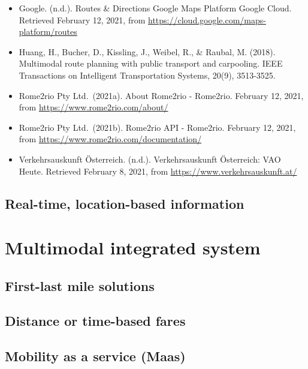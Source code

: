 \documentclass[
]{book}
\begin{document}
\begin{itemize}
\item
  Google. (n.d.). Routes \& Directions \textbar{} Google Maps Platform \textbar{} Google Cloud. Retrieved February 12, 2021, from \url{https://cloud.google.com/maps-platform/routes}
\item
  Huang, H., Bucher, D., Kissling, J., Weibel, R., \& Raubal, M. (2018). Multimodal route planning with public transport and carpooling. IEEE Transactions on Intelligent Transportation Systems, 20(9), 3513-3525.
\item
  Rome2rio Pty Ltd.~(2021a). About Rome2rio - Rome2rio. February 12, 2021, from \url{https://www.rome2rio.com/about/}
\item
  Rome2rio Pty Ltd.~(2021b). Rome2rio API - Rome2rio. February 12, 2021, from \url{https://www.rome2rio.com/documentation/}
\item
  Verkehrsauskunft Österreich. (n.d.). Verkehrsauskunft Österreich: VAO Heute. Retrieved February 8, 2021, from \url{https://www.verkehrsauskunft.at/}
\end{itemize}

\hypertarget{real-time-location-based-information}{%
\section{Real-time, location-based information}\label{real-time-location-based-information}}

\hypertarget{multimodal}{%
\chapter{Multimodal integrated system}\label{multimodal}}

\hypertarget{first-last-mile-solutions}{%
\section{First-last mile solutions}\label{first-last-mile-solutions}}

\hypertarget{distance-or-time-based-fares}{%
\section{Distance or time-based fares}\label{distance-or-time-based-fares}}

\hypertarget{maas}{%
\section{Mobility as a service (Maas)}\label{maas}}
\end{document}
